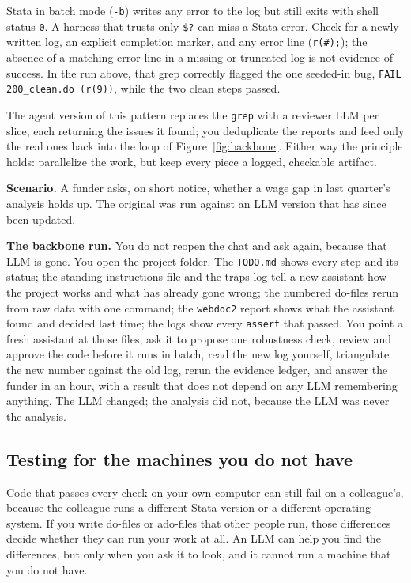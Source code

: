 \begin{vizcallout}
Stata in batch mode (\texttt{-b}) writes any error to the log but still exits with shell status \texttt{0}. A harness that trusts only \texttt{\$?} can miss a Stata error. Check for a newly written log, an explicit completion marker, and any error line (\texttt{r(\#);}); the absence of a matching error line in a missing or truncated log is not evidence of success. In the run above, that grep correctly flagged the one seeded-in bug, \texttt{FAIL 200\_clean.do (r(9))}, while the two clean steps passed.
\end{vizcallout}

The agent version of this pattern replaces the \texttt{grep} with a reviewer LLM per slice, each returning the issues it found; you deduplicate the reports and feed only the real ones back into the loop of Figure~\ref{fig:backbone}. Either way the principle holds: parallelize the work, but keep every piece a logged, checkable artifact.

\begin{appliedexample}\label{ae:ch13-reanalysis}
\textbf{Scenario.} A funder asks, on short notice, whether a wage gap in last quarter's analysis holds up. The original was run against an LLM version that has since been updated.

\medskip
\textbf{The backbone run.} You do not reopen the chat and ask again, because that LLM is gone. You open the project folder. The \texttt{TODO.md} shows every step and its status; the standing-instructions file and the traps log tell a new assistant how the project works and what has already gone wrong; the numbered do-files rerun from raw data with one command; the \texttt{webdoc2} report shows what the assistant found and decided last time; the logs show every \texttt{assert} that passed. You point a fresh assistant at those files, ask it to propose one robustness check, review and approve the code before it runs in batch, read the new log yourself, triangulate the new number against the old log, rerun the evidence ledger, and answer the funder in an hour, with a result that does not depend on any LLM remembering anything. The LLM changed; the analysis did not, because the LLM was never the analysis.
\end{appliedexample}

\subsection{Testing for the machines you do not have}\label{sec:ch13-environments}
Code that passes every check on your own computer can still fail on a colleague's, because the colleague runs a different Stata version or a different operating system. If you write do-files or ado-files that other people run, those differences decide whether they can run your work at all. An LLM can help you find the differences, but only when you ask it to look, and it cannot run a machine that you do not have.

